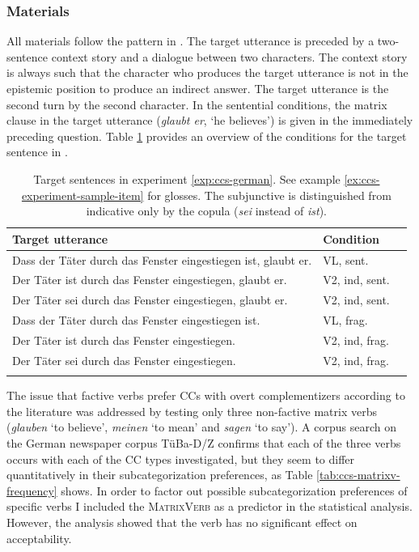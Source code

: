 \subsubsection{Materials}\label{sec:ccs-materials}
All materials follow the pattern in \Last. The target utterance is preceded by a two-sentence context story and a dialogue between two characters. The context story is always such that the character who produces the target utterance is not in the epistemic position to produce an indirect answer. The target utterance is the second turn by the second character. In the sentential conditions, the matrix clause in the target utterance (\textit{glaubt er}, `he believes') is given in the immediately preceding question. Table \ref{tab:ccs-german-materials} provides an overview of the conditions for the target sentence in \Last.

\begin{table}[t]
 \begin{tabular}{l l l}
 \lsptoprule
  Target utterance & Condition\\
\midrule
Dass der Täter durch  das Fenster  eingestiegen ist, glaubt er. &VL, sent.\\
Der Täter ist durch das Fenster  eingestiegen, glaubt er. & V2, ind, sent.\\
Der Täter sei durch das Fenster  eingestiegen, glaubt er. & V2, ind, sent.\\
Dass der Täter durch  das Fenster  eingestiegen ist. &VL, frag.\\
Der Täter ist durch das Fenster  eingestiegen. & V2, ind, frag.\\
Der Täter sei durch das Fenster  eingestiegen. & V2, ind, frag.\\

  \lspbottomrule
 \end{tabular}
\caption{Target sentences in experiment \ref{exp:ccs-german}. See example \ref{ex:ccs-experiment-sample-item} for glosses. The subjunctive  is distinguished from indicative only by the copula (\textit{sei} instead of \textit{ist}).\label{tab:ccs-german-materials}}
\end{table}

The issue that factive verbs prefer CCs with overt complementizers according to the literature \citep{kiparsky.kiparsky1970, hegarty1992} was addressed by testing only three non-factive matrix verbs (\textit{glauben} `to believe’, \textit{meinen} `to mean' and \textit{sagen} `to say'). A corpus search on the German newspaper corpus TüBa-D/Z \citep{telljohann.etal2004} confirms that each of the three verbs occurs with each of the CC types investigated, but they seem to differ quantitatively in their subcategorization preferences, as Table \ref{tab:ccs-matrixv-frequency} shows. In order to factor out possible subcategorization preferences of specific verbs I included the \textsc{MatrixVerb} as a predictor in the statistical analysis. However, the analysis showed that the verb has no significant effect on acceptability.

